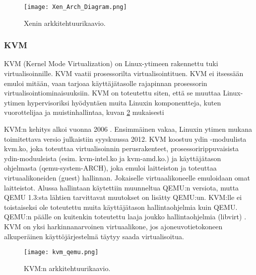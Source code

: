 
\begin{figure}[H]
\centering
\texttt{[image: Xen\_Arch\_Diagram.png]}
\caption{Xenin arkkitehtuurikaavio\cite{xen_overview}.}
\label{kuva_xen}
\end{figure}

\subsubsection{KVM}
KVM (Kernel Mode Virtualization) on Linux-ytimeen rakennettu tuki virtualisoinnille. KVM vaatii prosessorilta virtualisointituen. KVM ei itsessään emuloi mitään, vaan tarjoaa käyttäjätasolle rajapinnan prosessorin virtualisointiominaisuuksiin. KVM on toteutettu siten, että se muuttaa Linux-ytimen hypervisoriksi hyödyntäen muita Linuxin komponentteja, kuten vuorottelijaa ja muistinhallintaa, kuvan \ref{kuva_kvm} mukaisesti \citep{kvm1}

KVM:n kehitys alkoi vuonna 2006 \cite{kvm3}. Ensimmäinen vakaa, Linuxin ytimen mukana toimitettava versio julkaistiin syyskuussa 2012. KVM koostuu ydin -moduulista kvm.ko, joka toteuttaa virtualisoinnin perusrakenteet, prosessoririppuvaisista ydin-moduuleista (esim. kvm-intel.ko ja kvm-amd.ko.) ja käyttäjätason ohjelmasta (qemu-system-ARCH), joka emuloi laitteiston ja toteuttaa virtuaalikoneiden (guest) hallinnan. Jokaiselle virtuaalikoneelle emuloidaan omat laitteistot. Alussa hallintaan käytettiin muunneltua QEMU:n versiota, mutta QEMU 1.3:sta lähtien tarvittavat muutokset on lisätty QEMU:un. KVM:lle ei toistaiseksi ole toteutettu muita käyttäjätason hallintaohjelmia kuin QEMU. QEMU:n päälle on kuitenkin toteutettu laaja joukko hallintaohjelmia (libvirt) \cite{kvm2}. KVM on yksi harkinnanarvoinen virtuaalikone, jos ajoneuvotietokoneen alkuperäinen käyttöjärjestelmä täytyy saada virtualisoitua.


\begin{figure}[H]
\centering
\texttt{[image: kvm\_qemu.png]}
\caption{KVM:n arkkitehtuurikaavio.\cite{kvm4}}
\label{kuva_kvm}
\end{figure}

